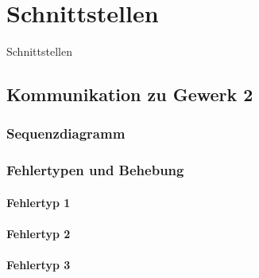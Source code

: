 
\chapter{Schnittstellen}
\label{sec:Schnittstellen}

Schnittstellen

\section{Kommunikation zu Gewerk 2}
\label{sec:}

\subsection{Sequenzdiagramm}
\label{sec:sequenzdiagram}


\subsection{Fehlertypen und Behebung}
\label{sec:Error}

\subsubsection{Fehlertyp 1}
\subsubsection{Fehlertyp 2}
\subsubsection{Fehlertyp 3}
